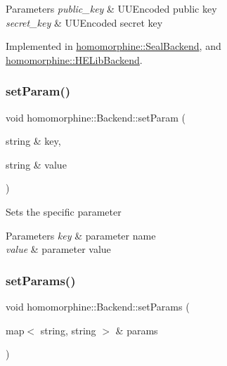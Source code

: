 \begin{DoxyParams}{Parameters}
{\em public\+\_\+key} & U\+U\+Encoded public key \\
\hline
{\em secret\+\_\+key} & U\+U\+Encoded secret key \\
\hline
\end{DoxyParams}


Implemented in \mbox{\hyperlink{classhomomorphine_1_1_seal_backend_a42afcc2823d616edc6be0e3950cf7196}{homomorphine\+::\+Seal\+Backend}}, and \mbox{\hyperlink{classhomomorphine_1_1_h_e_lib_backend_a2980c8eaf3556057aac364a1e61ab8cd}{homomorphine\+::\+H\+E\+Lib\+Backend}}.

\mbox{\label{classhomomorphine_1_1_backend_aacb924f4de6d50347d550da85aec15a2}} 
\subsubsection{\texorpdfstring{setParam()}{setParam()}}
{\footnotesize\ttfamily void homomorphine\+::\+Backend\+::set\+Param (\begin{DoxyParamCaption}\item[{string \&}]{key,  }\item[{string \&}]{value }\end{DoxyParamCaption})}

Sets the specific parameter


\begin{DoxyParams}{Parameters}
{\em key} & parameter name \\
\hline
{\em value} & parameter value \\
\hline
\end{DoxyParams}
\mbox{\label{classhomomorphine_1_1_backend_aed04b9aa4eb2c08801e099b16b4da4b0}} 
\subsubsection{\texorpdfstring{setParams()}{setParams()}}
{\footnotesize\ttfamily void homomorphine\+::\+Backend\+::set\+Params (\begin{DoxyParamCaption}\item[{map$<$ string, string $>$ \&}]{params }\end{DoxyParamCaption})}


